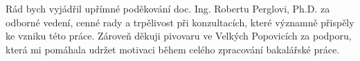 \documentclass[czech,bachelor,oneside]{ctufit-thesis}
\begin{document}
\frontmatter\frontmatterinit %

\thispagestyle{empty}\maketitle\thispagestyle{empty}\cleardoublepage %


\imprintpage %
\stopTOCentries

\begin{acknowledgmentpage}
	Rád bych vyjádřil upřímné poděkování doc. Ing. Robertu Perglovi, Ph.D. za odborné vedení, cenné rady a trpělivost při konzultacích, které významně přispěly ke vzniku této práce. Zároveň děkuji pivovaru ve Velkých Popovicích za podporu, která mi pomáhala udržet motivaci během celého zpracování bakalářské práce.
\end{acknowledgmentpage}
\end{document}
